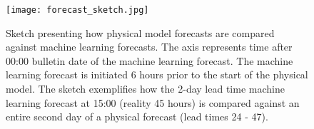 \documentclass[../main/thesis.tex]{subfiles}
\begin{document}
\begin{figure}
    \texttt{[image: forecast\_sketch.jpg]}
    \caption{\label{fig:physical_pipeline}Sketch presenting how physical model forecasts are compared against machine learning forecasts. The axis represents time after 00:00 bulletin date of the machine learning forecast. The machine learning forecast is initiated 6 hours prior to the start of the physical model. The sketch exemplifies how the 2-day lead time machine learning forecast at 15:00 (reality 45 hours) is compared against an entire second day of a physical forecast (lead times 24 - 47).}
\end{figure}


\biblio
\end{document}
